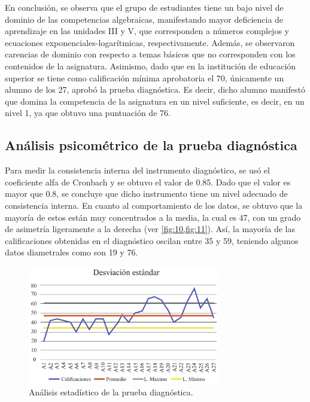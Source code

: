 \documentclass[spanish]{textolivre}
\begin{document}
En conclusión, se observa que el grupo de estudiantes tiene un bajo nivel de dominio de las competencias algebraicas, manifestando mayor deficiencia de aprendizaje en las unidades III y V, que corresponden a números complejos y ecuaciones exponenciales-logarítmicas, respectivamente. Además, se observaron carencias de dominio con respecto a temas básicos que no corresponden con los contenidos de la asignatura. Asimismo, dado que en la institución de educación superior se tiene como calificación mínima aprobatoria el 70, únicamente un alumno de los 27, aprobó la prueba diagnóstica. Es decir, dicho alumno manifestó que domina la competencia de la asignatura en un nivel suficiente, es decir, en un nivel 1, ya que obtuvo una puntuación de 76.  

\subsection{Análisis psicométrico de la prueba diagnóstica}\label{sec-titulo}
Para medir la consistencia interna del instrumento diagnóstico, se usó el coeficiente alfa de Cronbach y se obtuvo el valor de 0.85. Dado que el valor es mayor que 0.8, se concluye que dicho instrumento tiene un nivel adecuado de consistencia interna. En cuanto al comportamiento de los datos, se obtuvo que la mayoría de estos están muy concentrados a la media, la cual es 47, con un grado de asimetría ligeramente a la derecha (ver \cref{fig:10,fig:11}). Así, la mayoría de las calificaciones obtenidas en el diagnóstico oscilan entre 35 y 59, teniendo algunos datos diametrales como son 19 y 76. 

\begin{figure}[h!]
   \centering
   \includegraphics[width=0.75\textwidth]{fig-10.pdf}
   \caption{Análisis estadístico de la prueba diagnóstica.}
   \label{fig:10}
\end{figure}
\end{document}
